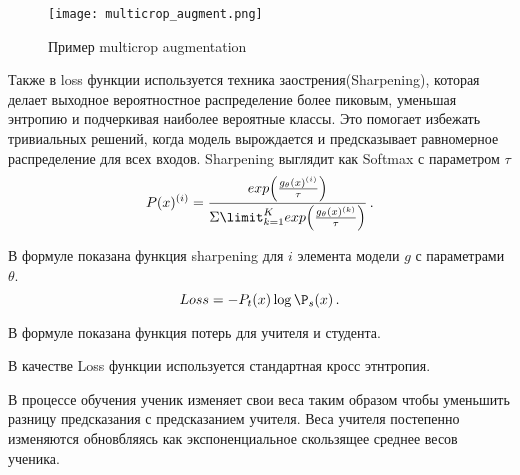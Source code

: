 \documentclass[../part_1.tex]{subfiles}
\begin{document}
    \begin{figure}[h]
        \centering
        \texttt{[image: multicrop\_augment.png]}
        \caption{Пример multicrop augmentation}
        \label{fig:multicrop_augment}
    \end{figure}
    \par Также в loss функции используется техника заострения(Sharpening), которая делает выходное вероятностное распределение более пиковым, уменьшая энтропию и подчеркивая наиболее вероятные классы. Это помогает избежать тривиальных решений, когда модель вырождается  и предсказывает равномерное распределение для всех входов. Sharpening выглядит как Softmax с параметром $\tau$
    \begin{equation}
        \label{sharpening}
        P(x)^{(i)} = \frac{exp\Big(\frac{g_\theta(x)^{(i)}}{\tau}\Big)}{\Sigma\limit^K_{k=1}exp\Big(\frac{g_\theta(x)^{(k)}}{\tau}\Big)}\,.
    \end{equation}
    
    \par В формуле  показана функция sharpening для $i$ элемента модели $g$ с параметрами $\theta$. 
    \begin{equation}
        \label{cross_entropy}
        Loss = -P_t(x) \log \P_s(x)\,.
    \end{equation}
    \par В формуле  показана функция потерь для учителя и студента.
    \par В качестве Loss функции используется стандартная кросс этнтропия.
    \par В процессе обучения ученик изменяет свои веса таким образом чтобы уменьшить разницу предсказания с предсказанием учителя. Веса учителя постепенно изменяются обновбляясь как экспоненциальное скользящее среднее весов ученика.
\end{document}
